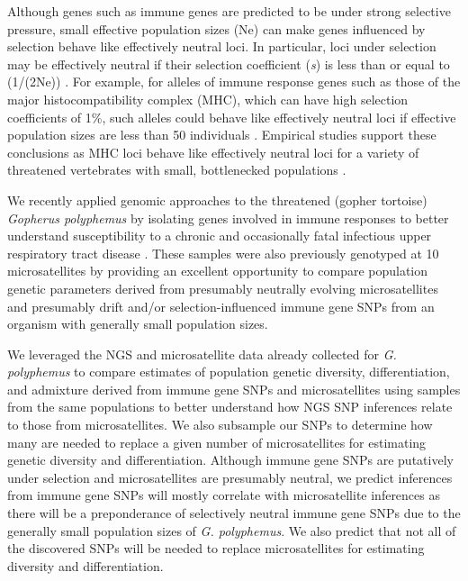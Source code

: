 \documentclass[english]{article}\usepackage[]{graphicx}\usepackage[]{color}
\begin{document}
Although genes such as immune genes are predicted to be under strong selective pressure, small effective population sizes (Ne) can make genes influenced by selection behave like effectively neutral loci. In particular, loci under selection may be effectively neutral if their selection coefficient (\textit{s}) is less than or equal to (1/(2Ne)) \citep{Wright_1931}. For example, for alleles of immune response genes such as those of the major histocompatibility complex (MHC), which can have high selection coefficients of 1\%, such alleles could behave like effectively neutral loci if effective population sizes are less than 50 individuals \citep{Frankham_et_al_2010}. Empirical studies support these conclusions as MHC loci behave like effectively neutral loci for a variety of threatened vertebrates with small, bottlenecked populations \citep{Weber_et_al_2004, Miller_et_al_2008, Taylor_et_al_2012}.

We recently applied genomic approaches to the threatened (gopher tortoise) \textit{Gopherus polyphemus} by isolating genes involved in immune responses to better understand susceptibility to a chronic and occasionally fatal infectious upper respiratory tract disease \citep{Elbers_and_Taylor_2015}. These samples were also previously genotyped at 10 microsatellites by \citet{Clostio_et_al_2012} providing an excellent opportunity to compare population genetic parameters derived from presumably neutrally evolving microsatellites and presumably drift and/or selection-influenced immune gene SNPs from an organism with generally small population sizes.

We leveraged the NGS \citep{Elbers_and_Taylor_2015} and microsatellite \citep{Clostio_et_al_2012} data already collected for \textit{G. polyphemus} to compare estimates of population genetic diversity, differentiation, and admixture derived from immune gene SNPs and microsatellites using samples from the same populations to better understand how NGS SNP inferences relate to those from microsatellites. We also subsample our SNPs to determine how many are needed to replace a given number of microsatellites for estimating genetic diversity and differentiation. Although immune gene SNPs are putatively under selection and microsatellites are presumably neutral, we predict inferences from immune gene SNPs will mostly correlate with microsatellite inferences as there will be a preponderance of selectively neutral immune gene SNPs due to the generally small population sizes of \textit{G. polyphemus}. We also predict that not all of the discovered SNPs will be needed to replace microsatellites for estimating diversity and differentiation.
\end{document}
